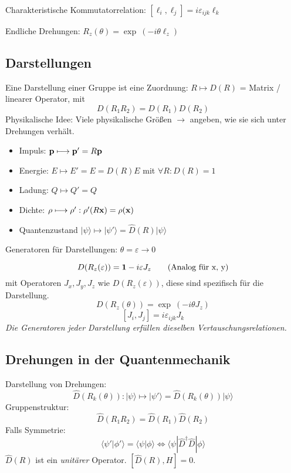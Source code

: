 \documentclass[11pt,a4paper]{report}
\begin{document}
Charakteristische Kommutatorrelation: $[\ell_i, \ell_j]=i\varepsilon_{ijk}\ell_k$\par 

Endliche Drehungen: $R_z(\theta ) = \exp\:(-i\theta\ell_z)$

\subsection{Darstellungen}

Eine Darstellung einer Gruppe ist eine Zuordnung: $R\mapsto D(R)$ = Matrix / linearer Operator, mit 
$$D(R_1R_2) = D(R_1)D(R_2)$$
Physikalische Idee: Viele physikalische Größen $\rightarrow$ angeben, wie sie sich unter Drehungen verhält.
\begin{itemize}
\item Impuls: $\mathbf{p}\longmapsto \mathbf{p}'=R\mathbf{p}$
\item Energie: $E\longmapsto E' = E=D(R)E$ mit $\forall R: D(R)=1$
\item Ladung: $Q\longmapsto Q' = Q$
\item Dichte: $\rho \longmapsto \rho ' :\rho'(R\mathbf{x})=\rho (\mathbf{x})$
\item Quantenzustand $|\psi\rangle\longmapsto |\psi '\rangle = \hat{D}(R)|\psi\rangle$
\end{itemize}

Generatoren für Darstellungen: $\theta=\varepsilon\rightarrow 0$\par 
$$D(R_z(\varepsilon ))=\mathbf{1} - i\varepsilon J_z\qquad\text{(Analog für x, y)}$$
mit Operatoren $J_x, J_y, J_z$ wie $D(R_z(\varepsilon ))$, diese sind spezifisch für die Darstellung.
$$D(R_z(\theta ))=\exp\:(-i\theta J_z)$$
$$[J_i, J_j] = i\varepsilon_{ijk}J_k$$
\emph{Die Generatoren jeder Darstellung erfüllen dieselben Vertauschungsrelationen.}

\subsection{Drehungen in der Quantenmechanik}

\newcommand{\ket}[1]{|#1\rangle}
\newcommand{\braket}[2]{\langle #1|#2\rangle}
\newcommand{\erwop}[3]{\langle #1|#2|#3\rangle}

Darstellung von Drehungen:
$$\hat{D}(R_k(\theta )):\ket{\psi}\mapsto\ket{\psi'}=\hat{D}(R_k(\theta ))\ket{\psi}$$
Gruppenstruktur:
$$\hat{D}(R_1R_2)=\hat{D}(R_1)\hat{D}(R_2)$$
Falls Symmetrie:
$$\braket{\psi '}{\phi '} = \braket{\psi}{\phi} \Leftrightarrow\erwop{\psi}{\hat{D}^\dagger\hat{D}}{\phi}$$
$\hat{D}(R)$ ist ein \textit{unitärer} Operator. $[\hat{D}(R), H]=0$.\par 
\end{document}

